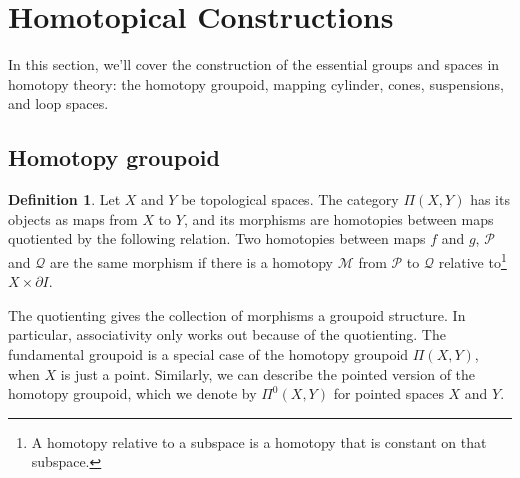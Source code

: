 \documentclass[12pt, notitlepage]{article}
\theoremstyle{definition}
\newtheorem{defn}{Definition}[section]
\begin{document}
\section{Homotopical Constructions}
In this section, we'll cover the construction of the essential groups and spaces in homotopy theory: the homotopy groupoid, mapping cylinder, cones, suspensions, and loop spaces.

\subsection{Homotopy groupoid}
\begin{defn}
Let $X$ and $Y$ be topological spaces. The category $\Pi(X,Y)$ has its objects as maps from $X$ to $Y$, and its morphisms are homotopies between maps quotiented by the following relation. Two homotopies between maps $f$ and $g$, $\mathcal{P}$ and $\mathcal{Q}$ are the same morphism if
there is a homotopy $\mathcal{M}$ from $\mathcal{P}$ to $\mathcal{Q}$ relative to\footnote{A homotopy relative to a subspace is a homotopy that
is constant on that subspace.} $X \times \partial I$.
\end{defn}
The quotienting gives the collection of morphisms a groupoid structure. In
particular, associativity only works out because of the quotienting. The fundamental groupoid is a special case of the homotopy groupoid $\Pi(X,Y)$, when $X$ is just a point. Similarly, we can describe the pointed version of the homotopy groupoid, which we denote by $\Pi^0(X,Y)$ for pointed spaces $X$ and $Y$.
\end{document}
